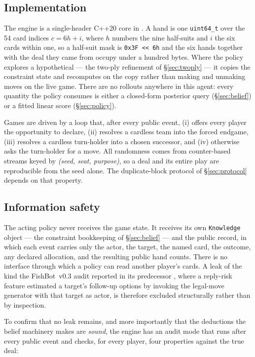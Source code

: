 \documentclass[11pt]{article}
\theoremstyle{definition}
\DeclareRobustCommand{\vthree}{\texorpdfstring{\mbox{FishBot v0.3}}{FishBot v0.3}}
\begin{document}
\subsection{Implementation}

The engine is a single-header C++20 core in . A hand is one
\verb|uint64_t| over the 54 card indices $c = 6h + i$, where $h$ numbers the nine
half-suits and $i$ the six cards within one, so a half-suit mask is
\verb|0x3F << 6h| and the six hands together with the deal they came from occupy
under a hundred bytes. Where the policy explores a hypothetical --- the two-ply
refinement of \S\ref{sec:twoply} --- it copies the constraint state and
recomputes on the copy rather than making and unmaking moves on the live game.
There are no rollouts anywhere in this agent: every quantity the policy consumes
is either a closed-form posterior query (\S\ref{sec:belief}) or a fitted linear
score (\S\ref{sec:policy}).

Games are driven by a loop that, after every public event, (i) offers every
player the opportunity to declare, (ii) resolves a cardless team into the forced
endgame, (iii) resolves a cardless turn-holder into a chosen successor, and
(iv) otherwise asks the turn-holder for a move. All randomness comes from
counter-based streams keyed by \emph{(seed, seat, purpose)}, so a deal and its
entire play are reproducible from the seed alone. The duplicate-block protocol
of \S\ref{sec:protocol} depends on that property.

\subsection{Information safety}

The acting policy never receives the game state. It receives its own
\texttt{Knowledge} object --- the constraint bookkeeping of
\S\ref{sec:belief} --- and the public record, in which each event carries only
the actor, the target, the named card, the outcome, any declared allocation, and
the resulting public hand counts. There is no interface through which a policy
can read another player's cards. A leak of the kind the \vthree{} audit reported
in its predecessor \cite{fishbot03}, where a reply-risk feature estimated a
target's follow-up options by invoking the legal-move generator with that target
as actor, is therefore excluded structurally rather than by inspection.

To confirm that no leak remains, and more importantly that the deductions the
belief machinery makes are \emph{sound}, the engine has an audit mode that runs
after every public event and checks, for every player, four properties against
the true deal:
\end{document}
